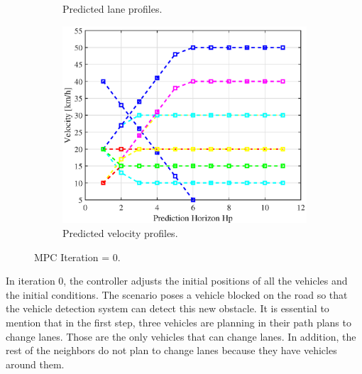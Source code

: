 \begin{figure}[H]
\begin{subfigure}[b]{0.45\textwidth}
    \caption{Predicted lane profiles.}
    \label{fig:second}
\end{subfigure}
\hfill
\begin{subfigure}[b]{0.45\textwidth}
    \includegraphics[width=\textwidth]{Kap6/obs_avoid/obs_avoid_vel0.eps}
    \caption{Predicted velocity profiles.}
    \label{fig:third}
\end{subfigure}
\caption{MPC Iteration = 0.}
\label{fig:figures}
\end{figure}

In iteration 0, the controller adjusts the initial positions of all the vehicles and the initial conditions. The scenario poses a vehicle blocked on the road so that the vehicle detection system can detect this new obstacle. It is essential to mention that in the first step, three vehicles are planning in their path plans to change lanes. Those are the only vehicles that can change lanes. In addition, the rest of the neighbors do not plan to change lanes because they have vehicles around them.
\\

